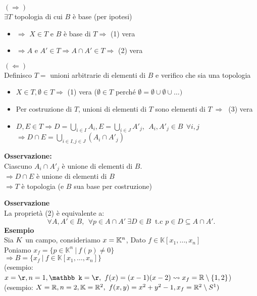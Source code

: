 \documentclass[12px]{article}
\begin{document}
\begin{dimo}
	$( \Rightarrow )$ \\
	$\exists T$ topologia di cui $B$ è base (per ipotesi)\\
	\begin{itemize}
		\item $ \Rightarrow $ $X\in T$ e $B$ è base di $T \Rightarrow $ (1) vera
\item $ \Rightarrow A$ e $A'\in T \Rightarrow A\cap A'\in T \Rightarrow $ (2) vera
	\end{itemize}
	$ ( \Leftarrow )$ \\
	Definisco $T = $ unioni arbitrarie di elementi di $B$ e verifico che sia una topologia
	\begin{itemize}
		\item $X\in T, \emptyset\in T \Rightarrow $ (1) vera ($\emptyset\in T$ perché $\emptyset = \emptyset\cup\emptyset\cup\ldots )$
		\item Per costruzione di  $T$, unioni di elementi di $T$ sono elementi di $T\ \Rightarrow \ $ (3) vera
		\item $D,E\in T \Rightarrow D = \bigcup_{i\in I} A_i, E = \bigcup_{i\in J}A'_j, \ \ A_i,A'_j\in B \  \ \forall i,j$ \\
			$ \Rightarrow D\cap E = \bigcup^{}_{i\in I, j\in J}(A_i\cap A'_j)$
	\end{itemize}
	\textbf{Osservazione:}\\
	Ciascuno $A_i\cap A'_j$ è unione di elementi di $B.$ \\
	$ \Rightarrow D\cap E$ è unione di elementi di $B$\\
	 $ \Rightarrow T $ è topologia (e $B$ sua base per costruzione)
\end{dimo}
\textbf{Osservazione}\\
La proprietà (2) è equivalente a:
\[
	\forall A,A'\in B, \ \ \forall p\in A\cap A' \ \exists D\in B \ \text{ t.c } p\in D\subseteq A\cap A'
.\] 
\textbf{Esempio}\\
Sia $\mathbb \mathbb{K}$ un campo, consideriamo $x = \mathbb {\mathbb{K}}^n$, Dato  $f\in \mathbb K[x_1,\ldots,x_n]$\\
Poniamo $x_f = \{p\in\mathbb K^n \ | \ f(p)\neq 0\}$\\
$ \Rightarrow  B = \{x_f \ | \ f\in \mathbb K[x_1,\ldots,x_n]\}$ \\
(esempio: $x = \r, n = 1, \mathbb k = \r, \ f(x) = (x-1)(x-2) \leadsto x_f= \R\setminus\{1,2\}$)
(esempio: $X = \mathbb{R}, n = 2, \mathbb K = \mathbb{R}^2, \ f(x,y) = x^2 + y^2 - 1, x_f = \mathbb{R}^2\setminus S^1)\\$
\end{document}
